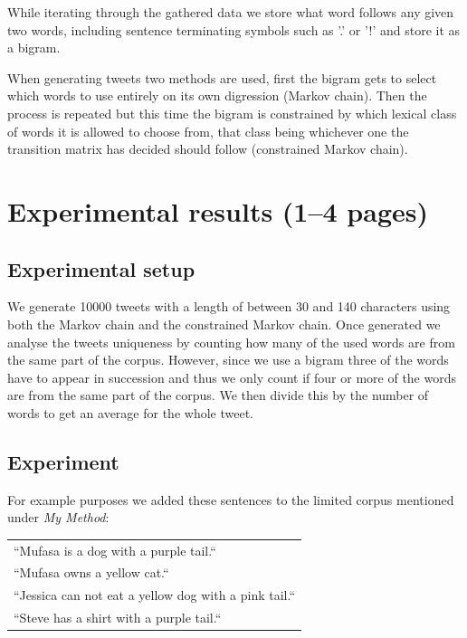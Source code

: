 \documentclass[a4paper,12pt]{article}
\begin{document}
While iterating through the gathered data we store what word follows any given two words, including sentence terminating symbols such as '.' or '!' and store it as a bigram.

When generating tweets two methods are used, first the bigram gets to select which words to use entirely on its own digression (Markov chain). Then the process is repeated but this time the bigram is constrained by which lexical class of words it is allowed to choose from, that class being whichever one the transition matrix has decided should follow (constrained Markov chain).

\section{Experimental results (1--4 pages)}
\label{sec:exps}

\subsection{Experimental setup}
We generate 10000 tweets with a length of between 30 and 140 characters using both the Markov chain and the constrained Markov chain. 
Once generated we analyse the tweets uniqueness by counting how many of the used words are from the same part of the corpus. However, since we use a bigram three of the words have to appear in succession and thus we only count if four or more of the words are from the same part of the corpus. We then divide this by the number of words to get an average for the whole tweet.

\subsection{Experiment}

For example purposes we added these sentences to the limited corpus mentioned under \textit{My Method}:

\begin{tabular}{l}
``Mufasa is a dog with a purple tail.``\\
``Mufasa owns a yellow cat.``\\
``Jessica can not eat a yellow dog with a pink tail.``\\
``Steve has a shirt with a purple tail.``\\
\end{tabular}
\end{document}
